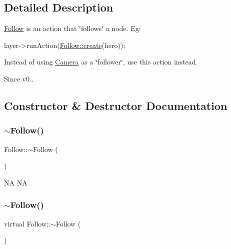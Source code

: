 \subsection{Detailed Description}
\hyperlink{classFollow}{Follow} is an action that \char`\"{}follows\char`\"{} a node. Eg\+: 


\begin{DoxyCode}
layer->runAction(\hyperlink{classFollow_aeb7d82d7545e2b2ab7826f8f6661d5b7}{Follow::create}(hero));
\end{DoxyCode}
 Instead of using \hyperlink{classCamera}{Camera} as a \char`\"{}follower\char`\"{}, use this action instead. \begin{DoxySince}{Since}
v0.. 
\end{DoxySince}


\subsection{Constructor \& Destructor Documentation}
\mbox{\label{classFollow_ad525d890c104b47d89374871d408b184}} 
\subsubsection{\texorpdfstring{$\sim$\+Follow()}{~Follow()}\hspace{0.1cm}{\footnotesize\ttfamily [1/2]}}
{\footnotesize\ttfamily Follow\+::$\sim$\+Follow (\begin{DoxyParamCaption}{ }\end{DoxyParamCaption})\hspace{0.3cm}{\ttfamily [virtual]}}

NA  NA \mbox{\label{classFollow_af863ea889c89a53632c62043f96d0397}} 
\subsubsection{\texorpdfstring{$\sim$\+Follow()}{~Follow()}\hspace{0.1cm}{\footnotesize\ttfamily [2/2]}}
{\footnotesize\ttfamily virtual Follow\+::$\sim$\+Follow (\begin{DoxyParamCaption}{ }\end{DoxyParamCaption})\hspace{0.3cm}{\ttfamily [virtual]}}


